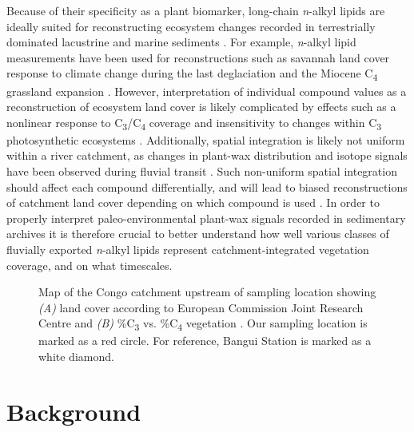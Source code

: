 Because of their specificity as a plant biomarker, long-chain \textit{n}-alkyl lipids are ideally suited for reconstructing ecosystem changes recorded in terrestrially dominated lacustrine and marine sediments \citep{Pancost:2004ij,Eglinton:2008hs,Castaneda:2011jb,Freeman:2014gi}. For example, \textit{n}-alkyl lipid  measurements have been used for reconstructions such as savannah land cover response to climate change during the last deglaciation \citep{Hughen:2004gc} and the Miocene C\textsubscript{4} grassland expansion \citep{Freeman:2001tv,Hoetzel:2013hj}. However, interpretation of individual compound  values as a reconstruction of ecosystem land cover is likely complicated by effects such as a nonlinear response to C\textsubscript{3}/C\textsubscript{4} coverage \citep{Garcin:2014hg} and insensitivity to changes within C\textsubscript{3} photosynthetic ecosystems \citep[\textit{\textit{i.e.}} woody vs. non-woody][]{Feakins:2013ks,Magill:2013ab,Magill:2013cz}. Additionally, spatial integration is likely not uniform within a river catchment, as changes in plant-wax distribution and isotope signals have been observed during fluvial transit \citep{Galy:2011hk,Galy:2011ix,Ponton:2014jr}. Such non-uniform spatial integration should affect each compound differentially, and will lead to biased reconstructions of catchment land cover depending on which compound is used \citep[\textit{e.g.}][]{Wang:2013jz}. In order to properly interpret paleo-environmental plant-wax signals recorded in sedimentary archives it is therefore crucial to better understand how well various classes of fluvially exported \textit{n}-alkyl lipids represent catchment-integrated vegetation coverage, and on what timescales.

\begin{figure}[t]
	\caption[Congo catchment map showing land cover and \%C\textsubscript{3} vs. \%C\textsubscript{4} vegetation]{Map of the Congo catchment upstream of sampling location showing \textit{(A)} land cover according to European Commission Joint Research Centre \citep{Mayaux:2004uw} and \textit{(B)} \%C\textsubscript{3} vs. \%C\textsubscript{4} vegetation \citep{Still:2010wh}. Our sampling location is marked as a red circle. For reference, Bangui Station \citep{Coynel:2005cn,Bouillon:2012cw,Bouillon:2014ko} is marked as a white diamond.}
	\label{Ch4Fig:1} 
\end{figure}

\section{Background}

